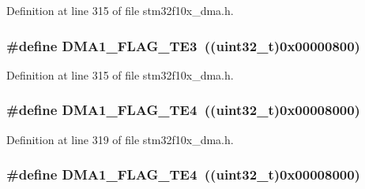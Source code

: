 Definition at line 315 of file stm32f10x\+\_\+dma.\+h.

\subsubsection[{\texorpdfstring{D\+M\+A1\+\_\+\+F\+L\+A\+G\+\_\+\+T\+E3}{DMA1_FLAG_TE3}}]{\setlength{\rightskip}{0pt plus 5cm}\#define D\+M\+A1\+\_\+\+F\+L\+A\+G\+\_\+\+T\+E3~(({\bf uint32\+\_\+t})0x00000800)}\hypertarget{group___d_m_a__flags__definition_gaa0b3d86f09829d0388273f0cd51698cc}{}\label{group___d_m_a__flags__definition_gaa0b3d86f09829d0388273f0cd51698cc}


Definition at line 315 of file stm32f10x\+\_\+dma.\+h.

\subsubsection[{\texorpdfstring{D\+M\+A1\+\_\+\+F\+L\+A\+G\+\_\+\+T\+E4}{DMA1_FLAG_TE4}}]{\setlength{\rightskip}{0pt plus 5cm}\#define D\+M\+A1\+\_\+\+F\+L\+A\+G\+\_\+\+T\+E4~(({\bf uint32\+\_\+t})0x00008000)}\hypertarget{group___d_m_a__flags__definition_ga53beafec27ed89735e83fc7577a00d39}{}\label{group___d_m_a__flags__definition_ga53beafec27ed89735e83fc7577a00d39}


Definition at line 319 of file stm32f10x\+\_\+dma.\+h.

\subsubsection[{\texorpdfstring{D\+M\+A1\+\_\+\+F\+L\+A\+G\+\_\+\+T\+E4}{DMA1_FLAG_TE4}}]{\setlength{\rightskip}{0pt plus 5cm}\#define D\+M\+A1\+\_\+\+F\+L\+A\+G\+\_\+\+T\+E4~(({\bf uint32\+\_\+t})0x00008000)}\hypertarget{group___d_m_a__flags__definition_ga53beafec27ed89735e83fc7577a00d39}{}\label{group___d_m_a__flags__definition_ga53beafec27ed89735e83fc7577a00d39}


